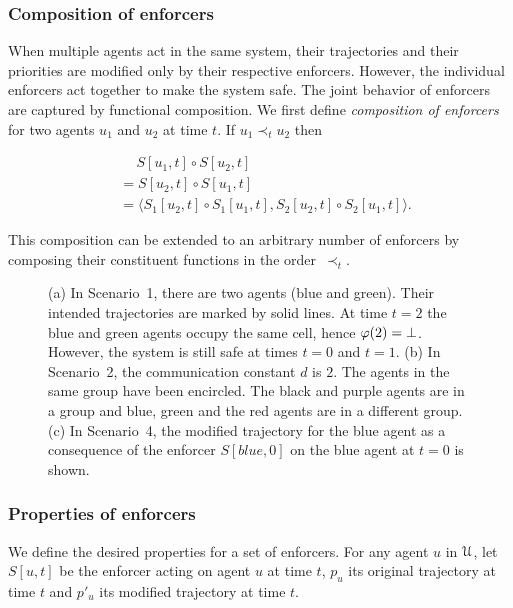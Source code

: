 \subsubsection*{Composition of enforcers}

When multiple agents act in the same system, their trajectories and their priorities are modified only by their respective enforcers. However, the individual enforcers act together to make the system safe. The joint behavior of enforcers are captured by functional composition.  We first define \emph{composition of enforcers} for two agents $u_1$ and $u_2$ at time $t$. If $u_1 \prec_t u_2$ then

\begin{align}
    &\quad~S[u_1,t] \circ S[u_2,t] \nonumber \\ 
    &= S[u_2,t] \circ S[u_1,t] \\
    &=\langle S_1[u_2,t] \circ S_1[u_1,t], S_2[u_2,t] \circ S_2[u_1,t]\rangle. %
\end{align}

This composition can be extended to an arbitrary number of enforcers by composing their constituent functions in the order~$\prec_t$.

\begin{figure*}[tbh]
\centering
{}
\caption{(a) In Scenario~1, there are two agents (blue and green). Their intended trajectories are marked by solid lines. At time $t=2$ the blue and green agents occupy the same cell, hence $\varphi(2) = \bot$. However, the system is still safe at times $t=0$ and $t=1$.
(b) In Scenario~2, the communication constant $d$ is $2$. The agents in the same group have been encircled. The black and purple agents are in a group and blue, green and the red agents are in a different group. (c)  In Scenario~4, the modified trajectory for the blue agent as a consequence of the enforcer $S[blue,0]$ on the blue agent at $t=0$ is shown.}
\label{fig:eg7}
\end{figure*}

\subsubsection*{Properties of enforcers}
We define the desired properties for a set of enforcers. 
For any agent $u$ in $\mathcal{U}$, let $S[u,t]$ be the enforcer acting on agent $u$ at time $t$, $p_u$ its original trajectory at time $t$ and $p'_u$ its modified trajectory at time $t$.  

